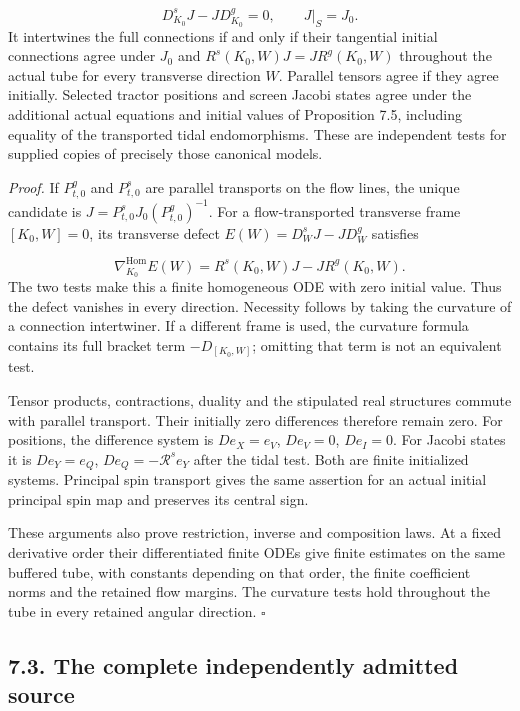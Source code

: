 \documentclass[
  english,
  11pt,
  reqno]{amsart}
\begin{document}
\label{eq:online-finite-rank-initialized-test} \[
D^s_{K_0}J-JD^g_{K_0}=0,\qquad J|_S=J_0.
\] It intertwines the full connections if and only if their tangential
initial connections agree under \(J_0\) and \(R^s(K_0,W)J=JR^g(K_0,W)\)
throughout the actual tube for every transverse direction \(W\).
Parallel tensors agree if they agree initially. Selected tractor
positions and screen Jacobi states agree under the additional actual
equations and initial values of Proposition 7.5, including equality of
the transported tidal endomorphisms. These are independent tests for
supplied copies of precisely those canonical models.

\emph{Proof.} If \(P^g_{t,0}\) and \(P^s_{t,0}\) are parallel transports
on the flow lines, the unique candidate is
\(J=P^s_{t,0}J_0(P^g_{t,0})^{-1}\). For a flow-transported transverse
frame \([K_0,W]=0\), its transverse defect \(E(W)=D^s_WJ-JD^g_W\)
satisfies

\label{eq:online-finite-rank-transverse-defect} \[
\nabla_{K_0}^{\operatorname{Hom}}E(W)
=R^s(K_0,W)J-JR^g(K_0,W).
\] The two tests make this a finite homogeneous ODE with zero initial
value. Thus the defect vanishes in every direction. Necessity follows by
taking the curvature of a connection intertwiner. If a different frame
is used, the curvature formula contains its full bracket term
\(-D_{[K_0,W]}\); omitting that term is not an equivalent test.

Tensor products, contractions, duality and the stipulated real
structures commute with parallel transport. Their initially zero
differences therefore remain zero. For positions, the difference system
is \(D e_X=e_V\), \(D e_V=0\), \(D e_I=0\). For Jacobi states it is
\(D e_Y=e_Q\), \(D e_Q=-\mathcal R^s e_Y\) after the tidal test. Both
are finite initialized systems. Principal spin transport gives the same
assertion for an actual initial principal spin map and preserves its
central sign.

These arguments also prove restriction, inverse and composition laws. At
a fixed derivative order their differentiated finite ODEs give finite
estimates on the same buffered tube, with constants depending on that
order, the finite coefficient norms and the retained flow margins. The
curvature tests hold throughout the tube in every retained angular
direction. \hfill\(\square\)

\subsection{7.3. The complete independently admitted
source}\label{the-complete-independently-admitted-source}\label{sec:online-independent-full-wave-source}
\end{document}
